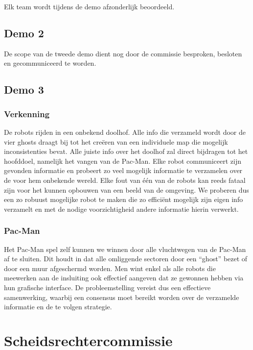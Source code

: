 \documentclass[12pt,a4paper]{report}
\begin{document}
Elk team wordt tijdens de demo afzonderlijk beoordeeld.
 
\section{Demo 2}
 
De scope van de tweede demo dient nog door de commissie besproken, besloten en gecommuniceerd te worden.

\section{Demo 3}

\subsection{Verkenning}

De robots rijden in een onbekend doolhof. Alle info die verzameld wordt door de vier ghosts draagt bij tot het cre\"eren van een individuele map die mogelijk inconsistenties bevat. Alle juiste info over het doolhof zal direct bijdragen tot het hoofddoel, namelijk het vangen van de Pac-Man. Elke robot communiceert zijn gevonden informatie en probeert zo veel mogelijk informatie te verzamelen over de voor hem onbekende wereld. Elke fout van \'e\'en van de robots kan reeds fataal zijn voor het kunnen opbouwen van een beeld van de omgeving. We proberen dus een zo robuust mogelijke robot te maken die zo effici\"ent mogelijk zijn eigen info verzamelt en met de nodige voorzichtigheid andere informatie hierin verwerkt.

\subsection{Pac-Man}

Het Pac-Man spel zelf kunnen we winnen door alle vluchtwegen van de Pac-Man af te sluiten. Dit houdt in dat alle omliggende sectoren door een ``ghost'' bezet of door een muur afgeschermd worden. Men wint enkel als alle robots die meewerken aan de insluiting ook effectief aangeven dat ze gewonnen hebben via hun grafische interface. De probleemstelling vereist dus een effectieve samenwerking, waarbij een consensus moet bereikt worden over de verzamelde informatie en de te volgen strategie.

\chapter{Scheidsrechtercommissie}
\end{document}
